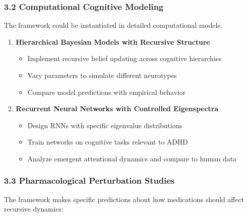 \documentclass[
]{article}
\providecommand{\tightlist}{%
  \setlength{\itemsep}{0pt}\setlength{\parskip}{0pt}}
\begin{document}
\subsubsection{3.2 Computational Cognitive
Modeling}\label{computational-cognitive-modeling}

The framework could be instantiated in detailed computational models:

\begin{enumerate}
\def\labelenumi{\arabic{enumi}.}
\tightlist
\item
  \textbf{Hierarchical Bayesian Models with Recursive Structure}

  \begin{itemize}
  \tightlist
  \item
    Implement recursive belief updating across cognitive hierarchies
  \item
    Vary parameters to simulate different neurotypes
  \item
    Compare model predictions with empirical behavior
  \end{itemize}
\item
  \textbf{Recurrent Neural Networks with Controlled Eigenspectra}

  \begin{itemize}
  \tightlist
  \item
    Design RNNs with specific eigenvalue distributions
  \item
    Train networks on cognitive tasks relevant to ADHD
  \item
    Analyze emergent attentional dynamics and compare to human data
  \end{itemize}
\end{enumerate}

\subsubsection{3.3 Pharmacological Perturbation
Studies}\label{pharmacological-perturbation-studies}

The framework makes specific predictions about how medications should
affect recursive dynamics:
\end{document}
